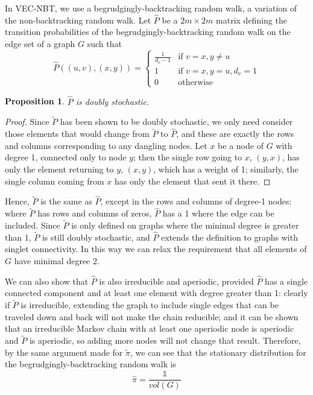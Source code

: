 \documentclass{article} %
\newtheorem{prop}{Proposition}
\begin{document}
In VEC-NBT, we use a begrudgingly-backtracking random walk, a variation of the non-backtracking random walk. Let $\hat P$ be a $2m \times 2m$ matrix defining the transition probabilities of the begrudgingly-backtracking random walk on the edge set of a graph $G$ such that
\[\hat P((u,v), (x,y)) = 
    \begin{cases} 
        \displaystyle\frac{1}{d_v-1} & \text{if } v = x, y \neq u\\
        1 & \text{if } v = x, y = u, d_v = 1 \\
        0 & \text{otherwise}
    \end{cases}
\]

\begin{prop}
$\hat P$ is doubly stochastic.
\end{prop}

\begin{proof}
Since $\tilde P$ has been shown to be doubly stochastic, we only need consider those elements that would change from $\tilde P$ to $\hat P$, and these are exactly the rows and columns corresponding to any dangling nodes. Let $x$ be a node of $G$ with degree 1, connected only to node $y$; then the single row going to $x$, $(y,x)$, has only the element returning to $y$, $(x,y)$, which has a weight of 1; similarly, the single column coming from $x$ has only the element that sent it there. 
\end{proof}

Hence, $\tilde P$ is the same as $\hat P$, except in the rows and columns of degree-1 nodes: where $\tilde P$ has rows and columns of zeros, $\hat P$ has a 1 where the edge can be included. Since $\tilde P$ is only defined on graphs where the minimal degree is greater than 1, $\tilde P$ is still doubly stochastic, and $\hat P$ extends the definition to graphs with singlet connectivity. In this way we can relax the requirement that all elements of $G$ have minimal degree 2.

We can also show that $\hat P$ is also irreducible and aperiodic, provided $\hat P$ has a single connected component and at least one element with degree greater than 1: clearly if $\tilde P$ is irreducible, extending the graph to include single edges that can be traveled down and back will not make the chain reducible; and it can be shown that an irreducible Markov chain with at least one aperiodic node is aperiodic and $\tilde P$ is aperiodic, so adding more nodes will not change that result. Therefore, by the same argument made for $\tilde \pi$, we can see that the stationary distribution for the begrudgingly-backtracking random walk is
$$\hat \pi = \frac{\mathds{1}}{vol(G)}$$
\end{document}
